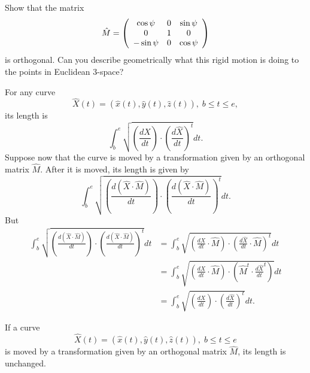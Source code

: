 \documentclass{ximera}
\begin{document}
\begin{exercise}
Show that the matrix%
\[
\hat{M}=\left(
\begin{array}
[c]{ccc}%
\cos\psi & 0 & \sin\psi\\
0 & 1 & 0\\
-\sin\psi & 0 & \cos\psi
\end{array}
\right)
\]
is orthogonal. Can you describe geometrically what this rigid motion is doing
to the points in Euclidean $3$-space?
\end{exercise}

For any curve%
\[
\hat{X}\left(  t\right)  =\left(  \hat{x}\left(  t\right)  ,\hat{y}\left(
t\right)  ,\hat{z}\left(  t\right)  \right)  ,\;b\leq t\leq e,
\]
its length is%
\[%
{\displaystyle\int\nolimits_{b}^{e}}
\sqrt{\left(  \frac{d\hat{X}}{dt}\right)  \cdot\left(  \frac{d\hat{X}}%
{dt}\right)  ^{t}}dt.
\]
Suppose now that the curve is moved by a transformation given by an orthogonal
matrix $\hat{M}$. After it is moved, its length is given by%
\[%
{\displaystyle\int\nolimits_{b}^{e}}
\sqrt{\left(  \frac{d\left(  \hat{X}\cdot\hat{M}\right)  }{dt}\right)
\cdot\left(  \frac{d\left(  \hat{X}\cdot\hat{M}\right)  }{dt}\right)  ^{t}%
}dt.
\]
But%
\begin{align*}%
{\displaystyle\int\nolimits_{b}^{e}}
\sqrt{\left(  \frac{d\left(  \hat{X}\cdot\hat{M}\right)  }{dt}\right)
\cdot\left(  \frac{d\left(  \hat{X}\cdot\hat{M}\right)  }{dt}\right)  ^{t}}dt
&  =%
{\displaystyle\int\nolimits_{b}^{e}}
\sqrt{\left(  \frac{d\hat{X}}{dt}\cdot\hat{M}\right)  \cdot\left(  \frac
{d\hat{X}}{dt}\cdot\hat{M}\right)  ^{t}}dt\\
&  =%
{\displaystyle\int\nolimits_{b}^{e}}
\sqrt{\left(  \frac{d\hat{X}}{dt}\cdot\hat{M}\right)  \cdot\left(  \hat{M}%
^{t}\cdot\frac{d\hat{X}}{dt}^{t}\right)  }dt\\
&  =%
{\displaystyle\int\nolimits_{b}^{e}}
\sqrt{\left(  \frac{d\hat{X}}{dt}\right)  \cdot\left(  \frac{d\hat{X}}%
{dt}\right)  ^{t}}dt.
\end{align*}


\begin{corollary}
If a curve
\[
\hat{X}\left(  t\right)  =\left(  \hat{x}\left(  t\right)  ,\hat{y}\left(
t\right)  ,\hat{z}\left(  t\right)  \right)  ,\;b\leq t\leq e
\]
is moved by a transformation given by an orthogonal matrix $\hat{M}$, its
length is unchanged.\pagebreak
\end{corollary}
\end{document}
